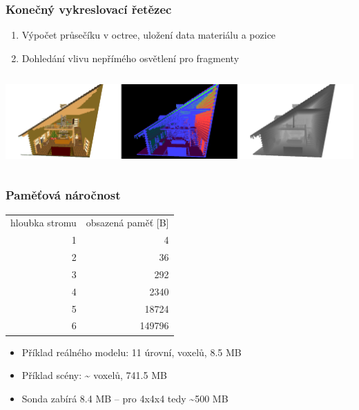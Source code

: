\documentclass[10pt,xcolor=pdflatex,hyperref={unicode},aspectratio=169]{beamer}
\begin{document}
\begin{frame}\frametitle{Konečný vykreslovací řetězec}
    \begin{enumerate}
        \item Výpočet průsečíku v octree, uložení data materiálu a pozice
        \item Dohledání vlivu nepřímého osvětlení pro fragmenty
    \end{enumerate}
    \begin{column}{\textwidth}
        \includegraphics[width=\textwidth]{img/gbuffer_render.png}
    \end{column}
\end{frame}

\begin{frame}\frametitle{Paměťová náročnost}
        \begin{table}[H]
        	\centering
        	\begin{tabular}{r|r}
        		\multicolumn{1}{c|}{hloubka stromu} & \multicolumn{1}{c}{obsazená paměť {[}B{]}} \\ \Xhline{3\arrayrulewidth}
        		1                                    & 4                                         \\ %
        		2                                    & 36                                        \\ %
        		3                                    & 292                                       \\ %
        		4                                    & 2340                                      \\ %
        		5                                    & 18724                                     \\ %
        		6                                    & 149796                                    \\ %
        	\end{tabular}
        \end{table}
        \begin{itemize}
            \item Příklad reálného modelu: 11 úrovní,  voxelů, 8.5 MB
            \item Příklad scény: \textasciitilde {} voxelů, 741.5 MB
            \item Sonda zabírá 8.4 MB -- pro 4x4x4 tedy \textasciitilde 500 MB
        \end{itemize}
\end{frame}
\end{document}
